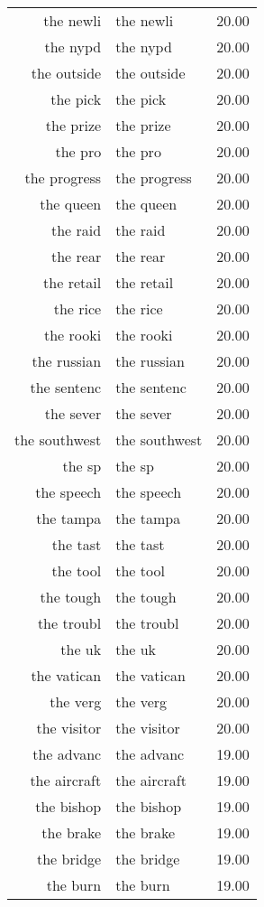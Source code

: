 \begin{table}[ht]
\begin{tabular}{rlr}
  the newli & the newli & 20.00 \\ 
  the nypd & the nypd & 20.00 \\ 
  the outside & the outside & 20.00 \\ 
  the pick & the pick & 20.00 \\ 
  the prize & the prize & 20.00 \\ 
  the pro & the pro & 20.00 \\ 
  the progress & the progress & 20.00 \\ 
  the queen & the queen & 20.00 \\ 
  the raid & the raid & 20.00 \\ 
  the rear & the rear & 20.00 \\ 
  the retail & the retail & 20.00 \\ 
  the rice & the rice & 20.00 \\ 
  the rooki & the rooki & 20.00 \\ 
  the russian & the russian & 20.00 \\ 
  the sentenc & the sentenc & 20.00 \\ 
  the sever & the sever & 20.00 \\ 
  the southwest & the southwest & 20.00 \\ 
  the sp & the sp & 20.00 \\ 
  the speech & the speech & 20.00 \\ 
  the tampa & the tampa & 20.00 \\ 
  the tast & the tast & 20.00 \\ 
  the tool & the tool & 20.00 \\ 
  the tough & the tough & 20.00 \\ 
  the troubl & the troubl & 20.00 \\ 
  the uk & the uk & 20.00 \\ 
  the vatican & the vatican & 20.00 \\ 
  the verg & the verg & 20.00 \\ 
  the visitor & the visitor & 20.00 \\ 
  the advanc & the advanc & 19.00 \\ 
  the aircraft & the aircraft & 19.00 \\ 
  the bishop & the bishop & 19.00 \\ 
  the brake & the brake & 19.00 \\ 
  the bridge & the bridge & 19.00 \\ 
  the burn & the burn & 19.00 \\ 

\end{tabular}
\end{table}
